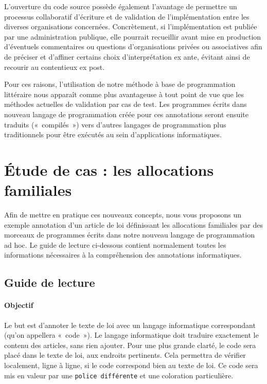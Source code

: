 \documentclass[12pt, french]{article}
\begin{document}
L'ouverture du code source possède également l'avantage de permettre un processus collaboratif d'écriture et de validation de l'implémentation entre les diverses organisations concernées. Concrètement, si l'implémentation est publiée par une administration publique, elle pourrait recueillir avant mise en production d'éventuels commentaires ou questions d'organisations privées ou associatives afin de préciser et d'affiner certains choix d'interprétation ex ante, évitant ainsi de recourir au contentieux ex post.

Pour ces raisons, l'utilisation de notre méthode à base de programmation littéraire nous apparaît comme plus avantageuse à tout point de vue que les méthodes actuelles de validation par cas de test. Les programmes écrits dans nouveau langage de programmation créée pour ces annotations seront ensuite traduits (« compilés ») vers d'autres langages de programmation plus traditionnels pour être exécutés au sein d'applications informatiques.

\section{Étude de cas : les allocations familiales}
Afin de mettre en pratique ces nouveaux concepts, nous vous proposons un exemple annotation d'un article de loi  définissant les allocations familiales par des morceaux de programmes écrits dans notre nouveau langage de programmation ad hoc. Le guide de lecture ci-dessous contient normalement toutes les informations nécessaires à la compréhension des annotations informatiques.

\subsection{Guide de lecture}

\paragraph{Objectif} Le but est d’annoter le texte de loi avec un langage informatique correspondant (qu’on appellera « code »). Le langage informatique doit traduire exactement le contenu des articles, sans rien ajouter. Pour une plus grande clarté, le code sera placé dans le texte de loi, aux endroits pertinents. Cela permettra de vérifier localement, ligne à ligne, si le code correspond bien au texte de loi. Ce code sera mis en valeur par une \verb|police différente| et une \textcolor{OliveGreen}{coloration particulière}.
\end{document}
